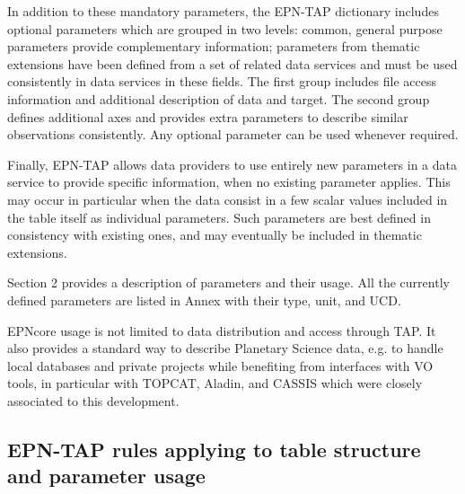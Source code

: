 \documentclass[11pt,a4paper]{ivoa}
\begin{document}
In addition to these mandatory parameters, the EPN-TAP dictionary includes optional parameters which are grouped in two levels: common, general purpose parameters provide complementary information; parameters from thematic extensions have been defined from a set of related data services and must be used consistently in data services in these fields. The first group includes file access information and additional description of data and target. The second group defines additional axes and provides extra parameters to describe similar observations consistently. Any optional parameter can be used whenever required. 

Finally, EPN-TAP allows data providers to use entirely new parameters in a data service to provide specific information, when no existing parameter applies. This may occur in particular when the data consist in a few scalar values included in the table itself as individual parameters. Such parameters are best defined in consistency with existing ones, and may eventually be included in thematic extensions. 

Section 2 provides a description of parameters and their usage. All the currently defined parameters are listed in Annex with their type, unit, and UCD. 

EPNcore usage is not limited to data distribution and access through TAP. It also provides a standard way to describe Planetary Science data, e.g. to handle local databases and private projects while benefiting from interfaces with VO tools, in particular with TOPCAT, Aladin, and CASSIS which were closely associated to this development. 

\subsection{EPN-TAP rules applying to table structure and parameter usage}
\end{document}

